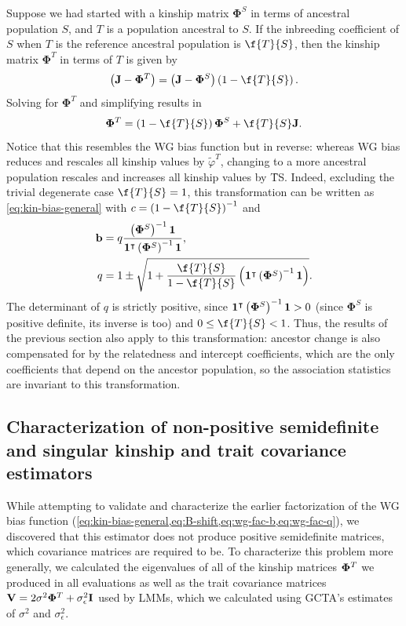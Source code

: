 \documentclass[11pt]{article}
\newcommand{\kinMat}[1][T]{%
  \ensuremath{%
    \mathbf{\Phi}^{#1}
  }%
  \xspace%
}%
\begin{document}
Suppose we had started with a kinship matrix \kinMat[S] in terms of ancestral population $S$, and $T$ is a population ancestral to $S$.
If the inbreeding coefficient of $S$ when $T$ is the reference ancestral population is $\f{T}{S}$, then the kinship matrix \kinMat in terms of $T$ is given by \citep{ochoa_estimating_2021}
$$
\left( \mathbf{J} - \kinMat \right)
=
\left( \mathbf{J} - \kinMat[S] \right) \left( 1 - \f{T}{S} \right)
.
$$
Solving for \kinMat and simplifying results in
$$
\kinMat
=
\left( 1 - \f{T}{S} \right) \kinMat[S] + \f{T}{S} \mathbf{J}
.
$$
Notice that this resembles the WG bias function but in reverse: whereas WG bias reduces and rescales all kinship values by $\tilde{\varphi}^T$, changing to a more ancestral population rescales and increases all kinship values by \f{T}{S}.
Indeed, excluding the trivial degenerate case $\f{T}{S} = 1$, this transformation can be written as \cref{eq:kin-bias-general} with
$c = \left( 1 - \f{T}{S} \right)^{-1}$ and
\begin{align*}
  \mathbf{b}
  &=
    q \frac{ \left( \kinMat[S] \right)^{-1} \mathbf{1} }{ \mathbf{1}^\intercal \left( \kinMat[S] \right)^{-1} \mathbf{1} }
  , \\
  q
  &=
    1 \pm \sqrt{1 + \frac{ \f{T}{S} }{ 1 - \f{T}{S} } \left( \mathbf{1}^\intercal \left( \kinMat[S] \right)^{-1} \mathbf{1} \right) }
.
\end{align*}
The determinant of $q$ is strictly positive, since $\mathbf{1}^\intercal \left( \kinMat[S] \right)^{-1} \mathbf{1} > 0$ (since \kinMat[S] is positive definite, its inverse is too) and $0 \le \f{T}{S} < 1$.
Thus, the results of the previous section also apply to this transformation: ancestor change is also compensated for by the relatedness and intercept coefficients, which are the only coefficients that depend on the ancestor population, so the association statistics are invariant to this transformation.

\subsection{Characterization of non-positive semidefinite and singular kinship and trait covariance estimators}

While attempting to validate and characterize the earlier factorization of the WG bias function (\cref{eq:kin-bias-general,eq:B-shift,eq:wg-fac-b,eq:wg-fac-q}), we discovered that this estimator does not produce positive semidefinite matrices, which covariance matrices are required to be.
To characterize this problem more generally, we calculated the eigenvalues of all of the kinship matrices $\kinMat$ we produced in all evaluations as well as the trait covariance matrices $\mathbf{V} = 2 \sigma^2 \kinMat + \sigma^2_\epsilon \mathbf{I}$ used by LMMs, which we calculated using GCTA's estimates of $\sigma^2$ and $\sigma^2_\epsilon$.
\end{document}
